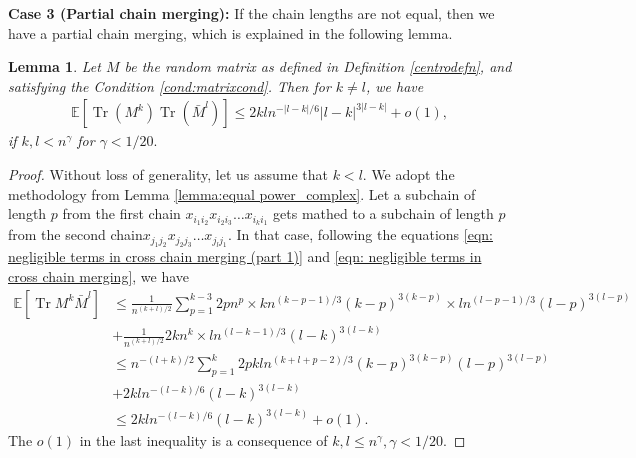 \documentclass[12pt]{amsart}
\theoremstyle{plain}
\newtheorem{lemma}[Thm]{Lemma}
\theoremstyle{definition}
\newcommand{\Tr}{\operatorname{Tr}}
\begin{document}

\textbf{Case 3 (Partial chain merging):}\label{case 2: partial chain merging} If the chain lengths are not equal, then we have a partial chain merging, which is explained in the following lemma.

\begin{lemma}\label{lemma: cross chain merging}
    Let $M$ be the random matrix as defined in Definition \ref{centrodefn}, and satisfying the Condition \ref{cond:matrixcond}. Then for $k\neq l$, we have
    \begin{align*}
        \mathbb{E}[\Tr(M^{k})\Tr(\bar{M}^{l})] \leq 2kln^{-|l-k|/6}|l-k|^{3|l-k|} + o(1),
    \end{align*}
    if $k,l<n^{\gamma}$ for $\gamma<1/20.$
\end{lemma}


\begin{proof}
    Without loss of generality, let us assume that $k<l$. We adopt the methodology from Lemma \ref{lemma:equal power_complex}. Let a subchain of length $p$ from the first chain $x_{i_{1}i_{2}}x_{i_{2}i_{3}}\dots x_{i_{k}i_{1}}$ gets mathed to a subchain of length $p$ from the second chain$ x_{j_{1}j_{2}}x_{j_{2}j_{3}}\dots x_{j_{l}j_{1}}.$ In that case, following the equations \eqref{eqn: negligible terms in cross chain merging (part 1)} and \eqref{eqn: negligible terms in cross chain merging}, we have
    \begin{align*}
        \mathbb{E}[\Tr M^{k}\bar{M}^{l}]&\leq\frac{1}{n^{(k+l)/2}}\sum_{p=1}^{k-3}2pn^{p}\times kn^{(k-p-1)/3}(k-p)^{3(k-p)}\times l n^{(l-p-1)/3}(l-p)^{3(l-p)}\\
        &+\frac{1}{n^{(k+l)/2}}2kn^{k}\times ln^{(l-k-1)/3}(l-k)^{3(l-k)}\\
        &\leq n^{-(l+k)/2}\sum_{p=1}^{k}2pkln^{(k+l+p-2)/3}(k-p)^{3(k-p)}(l-p)^{3(l-p)}\\
        &+2kln^{-(l-k)/6}(l-k)^{3(l-k)}\\
        &\leq 2kln^{-(l-k)/6}(l-k)^{3(l-k)} + o(1).
    \end{align*}
    The $o(1)$ in the last inequality is a consequence of $k,l\leq n^{\gamma}, \gamma<1/20.$
\end{proof}
\end{document}
